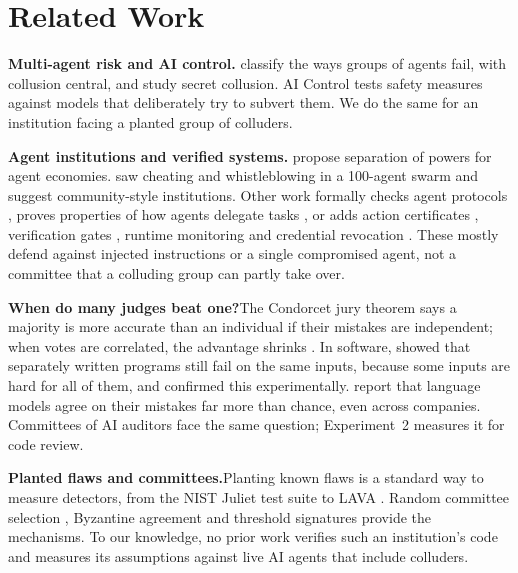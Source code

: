 \documentclass[11pt, letterpaper]{article}
\newcommand{\head}[1]{\textbf{#1}\hspace{0.45em}}
\begin{document}
\section{Related Work}\label{sec:related}

\head{Multi-agent risk and AI control.}\citet{hammond2025} classify the ways
groups of agents fail, with collusion central, and \citet{motwani2024} study
secret collusion. AI Control \citep{greenblatt2024} tests safety measures
against models that deliberately try to subvert them. We do the same for an
institution facing a planted group of colluders.

\head{Agent institutions and verified systems.}\citet{ruan2026} propose
separation of powers for agent economies. \citet{paglieri2026} saw cheating and
whistleblowing in a 100-agent swarm and suggest community-style institutions.
Other work formally checks agent protocols \citep{zheng2026}, proves properties
of how agents delegate tasks \citep{muruaga2026}, or adds action certificates
\citep{wang2026}, verification gates \citep{nguyen2026}, runtime monitoring
\citep{kekatos2026} and credential revocation \citep{deochake2026}. These mostly
defend against injected instructions or a single compromised agent, not a
committee that a colluding group can partly take over.

\head{When do many judges beat one?}The Condorcet jury theorem says a majority
is more accurate than an individual if their mistakes are independent; when
votes are correlated, the advantage shrinks \citep{ladha1992}. In software,
\citet{eckhardt1985} showed that separately written programs still fail on the
same inputs, because some inputs are hard for all of them, and
\citet{knight1986} confirmed this experimentally. \citet{kim2025} report that
language models agree on their mistakes far more than chance, even across
companies. Committees of AI auditors face the same question; Experiment~2
measures it for code review.

\head{Planted flaws and committees.}Planting known flaws is a standard way to
measure detectors, from the NIST Juliet test suite to LAVA
\citep{dolangavitt2016}. Random committee selection \citep{gilad2017}, Byzantine
agreement \citep{lamport1982} and threshold signatures \citep{desmedt1989}
provide the mechanisms. To our knowledge, no prior work verifies such an
institution's code and measures its assumptions against live AI agents that
include colluders.
\end{document}
